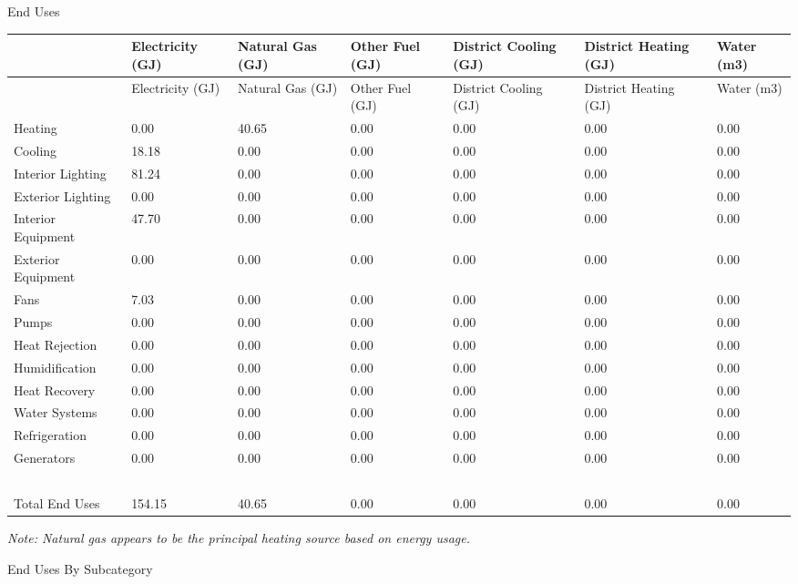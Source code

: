 End Uses

{\scriptsize
\begin{longtable}[c]{>{\raggedright}p{0.85in}>{\raggedright}p{0.85in}>{\raggedright}p{0.85in}>{\raggedright}p{0.85in}>{\raggedright}p{0.85in}>{\raggedright}p{0.85in}>{\raggedright}p{0.85in}}
\toprule 
~ & Electricity (GJ) & Natural Gas (GJ) & Other Fuel (GJ) & District Cooling (GJ) & District Heating (GJ) & Water (m3) \tabularnewline
\midrule
\endfirsthead

\toprule 
~ & Electricity (GJ) & Natural Gas (GJ) & Other Fuel (GJ) & District Cooling (GJ) & District Heating (GJ) & Water (m3) \tabularnewline
\midrule
\endhead

Heating & 0.00 & 40.65 & 0.00 & 0.00 & 0.00 & 0.00 \tabularnewline
Cooling & 18.18 & 0.00 & 0.00 & 0.00 & 0.00 & 0.00 \tabularnewline
Interior Lighting & 81.24 & 0.00 & 0.00 & 0.00 & 0.00 & 0.00 \tabularnewline
Exterior Lighting & 0.00 & 0.00 & 0.00 & 0.00 & 0.00 & 0.00 \tabularnewline
Interior Equipment & 47.70 & 0.00 & 0.00 & 0.00 & 0.00 & 0.00 \tabularnewline
Exterior Equipment & 0.00 & 0.00 & 0.00 & 0.00 & 0.00 & 0.00 \tabularnewline
Fans & 7.03 & 0.00 & 0.00 & 0.00 & 0.00 & 0.00 \tabularnewline
Pumps & 0.00 & 0.00 & 0.00 & 0.00 & 0.00 & 0.00 \tabularnewline
Heat Rejection & 0.00 & 0.00 & 0.00 & 0.00 & 0.00 & 0.00 \tabularnewline
Humidification & 0.00 & 0.00 & 0.00 & 0.00 & 0.00 & 0.00 \tabularnewline
Heat Recovery & 0.00 & 0.00 & 0.00 & 0.00 & 0.00 & 0.00 \tabularnewline
Water Systems & 0.00 & 0.00 & 0.00 & 0.00 & 0.00 & 0.00 \tabularnewline
Refrigeration & 0.00 & 0.00 & 0.00 & 0.00 & 0.00 & 0.00 \tabularnewline
Generators & 0.00 & 0.00 & 0.00 & 0.00 & 0.00 & 0.00 \tabularnewline
~ & ~ & ~ & ~ & ~ & ~ & ~ \tabularnewline
Total End Uses & 154.15 & 40.65 & 0.00 & 0.00 & 0.00 & 0.00 \tabularnewline
\bottomrule
\end{longtable}}

\emph{Note: Natural gas appears to be the principal heating source based on energy usage.}

End Uses By Subcategory

